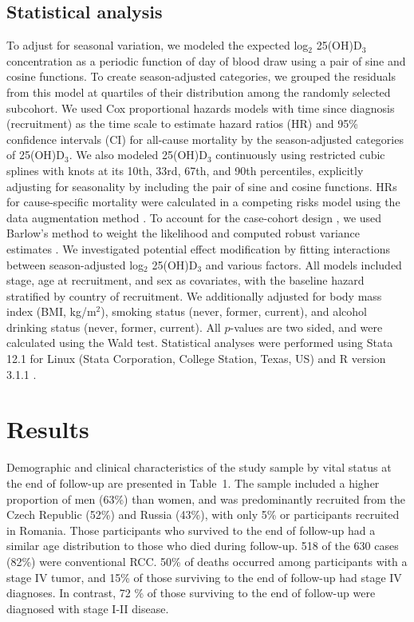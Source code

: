 \documentclass[a4paper,11pt]{article}
\begin{document}
\subsection*{Statistical analysis}
To adjust for seasonal variation, we modeled the expected log$_2$ 25(OH)D$_3$ 
concentration as a periodic function of day of blood draw using a pair of sine 
and cosine functions. To create season-adjusted categories, we grouped the 
residuals from this model at quartiles of their distribution among the randomly 
selected subcohort. We used Cox proportional hazards models with time since 
diagnosis (recruitment) as the time scale to estimate hazard ratios (HR) and 
95\% confidence intervals (CI) for all-cause mortality by the season-adjusted 
categories of 25(OH)D$_3$. We also modeled 25(OH)D$_3$ continuously using 
restricted cubic splines with knots at its 10th, 33rd, 67th, and 90th 
percentiles, explicitly adjusting for seasonality by including the pair of sine 
and cosine functions. HRs for cause-specific mortality were calculated in a 
competing risks model using the data augmentation method 
\cite{lunn_applying_1995}. To account for the case-cohort design 
\cite{prentice_case-cohort_1986}, we used Barlow's method to weight the 
likelihood and computed robust variance estimates \cite{barlow_robust_1994, 
barlow_analysis_1999}. We investigated potential effect modification by fitting 
interactions between season-adjusted log$_2$ 25(OH)D$_3$ and various factors. 
All models included stage, age at recruitment, and sex as covariates, with the 
baseline hazard stratified by country of recruitment. We additionally adjusted 
for body mass index (BMI, kg/m$^2$), smoking status (never, former, current), 
and alcohol drinking status (never, former, current).
All $p$-values are two sided, and were calculated using the Wald test. 
Statistical analyses were performed using Stata 12.1 for Linux (Stata 
Corporation, College Station, Texas, US) and R version 3.1.1 \cite{r_2014}.


\section*{Results}
Demographic and clinical characteristics of the study sample by vital status at 
the end of follow-up are presented in Table~1. The sample included a higher 
proportion of men (63\%) than women, and was predominantly recruited from the 
Czech Republic (52\%) and Russia (43\%), with only 5\% or participants 
recruited in Romania. Those participants who survived to the end of follow-up 
had a similar age distribution to those who died during follow-up. 518 
of the 630 cases (82\%) were conventional RCC. 50\% of deaths occurred among 
participants with a stage IV tumor, and 15\% of those surviving to the end of 
follow-up had stage IV diagnoses. In contrast, 72 \% of those surviving to the 
end of follow-up were diagnosed with stage I-II disease.
\end{document}
